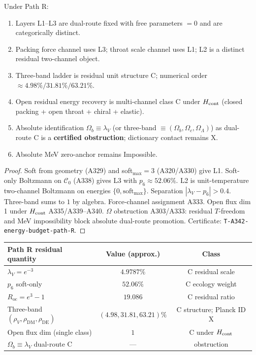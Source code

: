 \begin{theorem}
\label{thm:A342}
Under Path R:
\begin{enumerate}[label=(\roman*)]
\item Layers L1--L3 are dual-route fixed with free parameters $=0$ and are categorically distinct.
\item Packing force channel uses L3; throat scale channel uses L1; L2 is a distinct residual two-channel object.
\item Three-band ladder is residual unit structure C; numerical order $\approx 4.98\%/31.81\%/63.21\%$.
\item Open residual energy recovery is multi-channel class C under $H_{\rm cont}$ (closed packing + open throat + chiral + elastic).
\item Absolute identification $\Omega_b\equiv\lambda_V$ (or three-band $\equiv(\Omega_b,\Omega_c,\Omega_\Lambda)$) as dual-route C is a \textbf{certified obstruction}; dictionary contact remains X.
\item Absolute MeV zero-anchor remains Impossible.
\end{enumerate}
\end{theorem}

\begin{proof}
Soft from geometry (A329) and soft$_{\max}=3$ (A320/A330) give L1.
Soft-only Boltzmann on $\mathcal{C}_0$ (A338) gives L3 with $p_6\approx 52.06\%$.
L2 is unit-temperature two-channel Boltzmann on energies $\{0,\mathrm{soft}_{\max}\}$.
Separation $| \lambda_V-p_6 |>0.4$.
Three-band sums to $1$ by algebra.
Force-channel assignment A333.
Open flux dim 1 under $H_{\rm cont}$ A335/A339--A340.
$\Omega$ obstruction A303/A333: residual $T$-freedom and MeV impossibility block absolute dual-route promotion.
Certificate: \texttt{T-A342-energy-budget-path-R}.
\end{proof}

\begin{center}
\begin{tabular}{@{}lcc@{}}
\toprule
Path R residual quantity & Value (approx.) & Class \\
\midrule
$\lambda_V=e^{-3}$ & $4.9787\%$ & C residual scale \\
$p_6$ soft-only & $52.06\%$ & C ecology weight \\
$R_{\mathrm{oc}}=e^{3}-1$ & $19.086$ & C residual ratio \\
Three-band $(\rho_V,\rho_{\mathrm{DM}},\rho_{\mathrm{DE}})$ & $(4.98,31.81,63.21)\%$ & C structure; Planck ID X \\
Open flux dim (single class) & $1$ & C under $H_{\rm cont}$ \\
$\Omega_b\equiv\lambda_V$ dual-route C & --- & obstruction \\
\bottomrule
\end{tabular}
\end{center}

